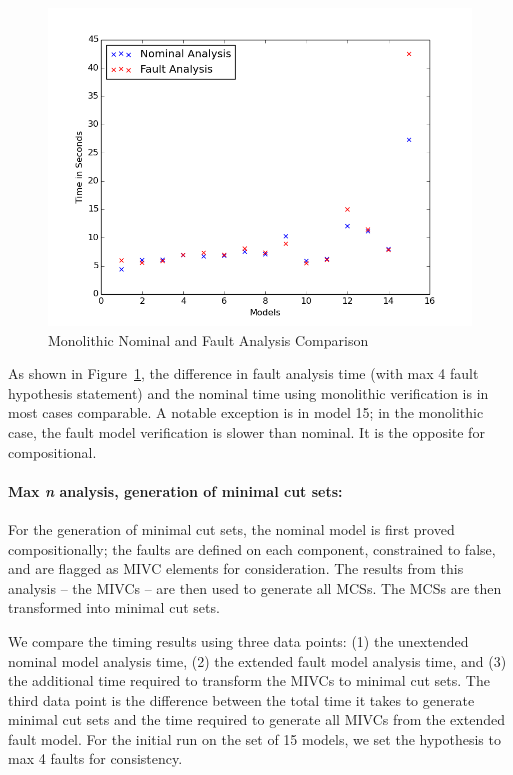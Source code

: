 \begin{figure}[htbp]
	\begin{center}
		\includegraphics[width=.7\textwidth]{images/graphMono15Models.png}
	\end{center}
	\vspace{-0.3in}
	\caption{Monolithic Nominal and Fault Analysis Comparison}
	\label{fig:graphMono15Models}
\end{figure}

As shown in Figure~\ref{fig:graphMono15Models}, the difference in fault analysis time (with max 4 fault hypothesis statement) and the nominal time using monolithic verification is in most cases comparable. A notable exception is in model 15; in the monolithic case, the fault model verification is slower than nominal. It is the opposite for compositional. 

\paragraph{Max \textit{n} analysis, generation of minimal cut sets:} For the generation of minimal cut sets, the nominal model is first proved compositionally; the faults are defined on each component, constrained to false, and are flagged as MIVC elements for consideration. The results from this analysis -- the MIVCs -- are then used to generate all MCSs. The MCSs are then transformed into minimal cut sets. 

We compare the timing results using three data points: (1) the unextended nominal model analysis time, (2) the extended fault model analysis time, and (3) the additional time required to transform the MIVCs to minimal cut sets. The third data point is the difference between the total time it takes to generate minimal cut sets and the time required to generate all MIVCs from the extended fault model. For the initial run on the set of 15 models, we set the hypothesis to max 4 faults for consistency. 

